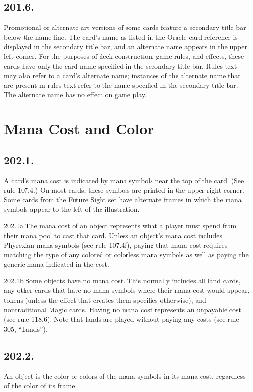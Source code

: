 \subsection*{201.6.}
Promotional or alternate-art versions of some cards feature a secondary title bar below the name line. The card’s name as listed in the Oracle card reference is displayed in the secondary title bar, and an alternate name appears in the upper left corner. For the purposes of deck construction, game rules, and effects, these cards have only the card name specified in the secondary title bar. Rules text may also refer to a card’s alternate name; instances of the alternate name that are present in rules text refer to the name specified in the secondary title bar. The alternate name has no effect on game play.

\section{Mana Cost and Color}
\subsection*{202.1.}
A card’s mana cost is indicated by mana symbols near the top of the card. (See rule 107.4.) On most cards, these symbols are printed in the upper right corner. Some cards from the Future Sight set have alternate frames in which the mana symbols appear to the left of the illustration.

202.1a The mana cost of an object represents what a player must spend from their mana pool to cast that card. Unless an object’s mana cost includes Phyrexian mana symbols (see rule 107.4f), paying that mana cost requires matching the type of any colored or colorless mana symbols as well as paying the generic mana indicated in the cost.

202.1b Some objects have no mana cost. This normally includes all land cards, any other cards that have no mana symbols where their mana cost would appear, tokens (unless the effect that creates them specifies otherwise), and nontraditional Magic cards. Having no mana cost represents an unpayable cost (see rule 118.6). Note that lands are played without paying any costs (see rule 305, “Lands”).

\subsection*{202.2.}
An object is the color or colors of the mana symbols in its mana cost, regardless of the color of its frame.

